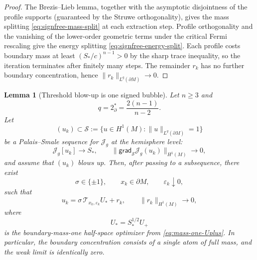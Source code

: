 \documentclass[11pt,reqno,a4paper]{amsart}
\numberwithin{equation}{section}
\theoremstyle{plain}
\newtheorem{lemma}[theorem]{Lemma}
\theoremstyle{remark}
\theoremstyle{plain}
\begin{document}
\begin{proof}
The Brezis--Lieb lemma, together with the asymptotic disjointness of the
profile supports (guaranteed by the Struwe orthogonality), gives the mass
splitting \eqref{eq:signfree-mass-split} at each extraction step.  Profile
orthogonality and the vanishing of the lower-order geometric terms under the
critical Fermi rescaling give the energy splitting
\eqref{eq:signfree-energy-split}.  Each profile costs boundary mass at least
$(S_\ast/c)^{n-1}>0$ by the sharp trace inequality, so the iteration
terminates after finitely many steps.  The remainder $r_k$ has no further
boundary concentration, hence $\|r_k\|_{L^q(\partial M)}\to0$.
\end{proof}

\begin{lemma}[Threshold blow-up is one signed bubble]
\label{lem:extremal-profile-onesigned}
Let $n\ge3$ and
\[
q=2^*_\partial=\frac{2(n-1)}{n-2}.
\]
Let
\[
(u_k)\subset\mathcal S
:=
\{u\in H^1(M):\|u\|_{L^q(\partial M)}=1\}
\]
be a Palais--Smale sequence for $\mathcal J_g$ at the hemisphere level:
\[
\mathcal J_g[u_k]\to S_\ast,
\qquad
\|\mathsf{grad}_{\mathcal S}\mathcal J_g(u_k)\|_{H^1(M)}\to0,
\]
and assume that $(u_k)$ blows up.  Then, after passing to a subsequence, there
exist
\[
\sigma\in\{\pm1\},
\qquad
x_k\in\partial M,
\qquad
\varepsilon_k\downarrow0,
\]
such that
\begin{equation}\label{eq:threshold-one-bubble-decomposition}
u_k
=
\sigma\,\mathcal T_{x_k,\varepsilon_k}U_\ast
+
r_k,
\qquad
\|r_k\|_{H^1(M)}\to0,
\end{equation}
where
\[
U_\ast=S_\ast^{1/2}U_+
\]
is the boundary-mass-one half-space optimizer from
\eqref{eq:mass-one-Uplus}.  In particular, the boundary concentration consists
of a single atom of full mass, and the weak limit is identically zero.
\end{lemma}
\end{document}
